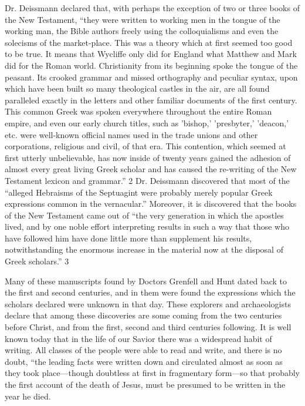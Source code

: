 Dr. Deissmann declared that, with perhaps the exception of two or three books of the New
Testament, ``they were written to working men in the tongue of the working man, the Bible
authors freely using the colloquialisms and even the solecisms of the market-place. This was
a theory which at first seemed too good to be true. It means that Wycliffe only did for
England what Matthew and Mark did for the Roman world. Christianity from its beginning
spoke the tongue of the peasant. Its crooked grammar and missed orthography and peculiar
syntax, upon which have been built so many theological castles in the air, are all found
paralleled exactly in the letters and other familiar documents of the first century. This
common Greek was spoken everywhere throughout the entire Roman empire, and even our
early church titles, such as 'bishop,' 'presbyter,' 'deacon,' etc. were well-known official names
used in the trade unions and other corporations, religious and civil, of that era. This
contention, which seemed at first utterly unbelievable, has now inside of twenty years gained
the adhesion of almost every great living Greek scholar and has caused the re-writing of the
New Testament lexicon and grammar.'' 2 Dr. Deissmann discovered that most of the ``alleged
Hebraisms of the Septuagint were probably merely popular Greek expressions common in
the vernacular.'' Moreover, it is discovered that the books of the New Testament came out of
``the very generation in which the apostles lived, and by one noble effort interpreting results
in such a way that those who have followed him have done little more than supplement his
results, notwithstanding the enormous increase in the material now at the disposal of Greek
scholars.'' 3

Many of these manuscripts found by Doctors Grenfell and Hunt dated back to the first and
second centuries, and in them were found the expressions which the scholars declared were
unknown in that day. These explorers and archaeologists declare that among these
discoveries are some coming from the two centuries before Christ, and from the first, second
and third centuries following. It is well known today that in the life of our Savior there was a
widespread habit of writing. All classes of the people were able to read and write, and there
is no doubt, ``the leading facts were written down and circulated almost as soon as they took
place—though doubtless at first in fragmentary form—so that probably the first account of
the death of Jesus, must be presumed to be written in the year he died.

